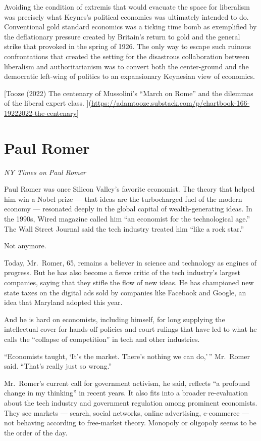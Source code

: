 \documentclass[
]{book}
\begin{document}
Avoiding the condition of extremis that would evacuate the space for liberalism was precisely what Keynes's political economics was ultimately intended to do. Conventional gold standard economics was a ticking time bomb as exemplified by the deflationary pressure created by Britain's return to gold and the general strike that provoked in the spring of 1926. The only way to escape such ruinous confrontations that created the setting for the disastrous collaboration between liberalism and authoritarianism was to convert both the center-ground and the democratic left-wing of politics to an expansionary Keynesian view of economics.

{[}Tooze (2022) The centenary of Mussolini's ``March on Rome'' and the dilemmas of the liberal expert class. {]}(\url{https://adamtooze.substack.com/p/chartbook-166-19222022-the-centenary}{]}

\hypertarget{paul-romer}{%
\section{Paul Romer}\label{paul-romer}}

\emph{NY Times on Paul Romer}

Paul Romer was once Silicon Valley's favorite economist. The theory that helped him win a Nobel prize --- that ideas are the turbocharged fuel of the modern economy --- resonated deeply in the global capital of wealth-generating ideas. In the 1990s, Wired magazine called him ``an economist for the technological age.'' The Wall Street Journal said the tech industry treated him ``like a rock star.''

Not anymore.

Today, Mr.~Romer, 65, remains a believer in science and technology as engines of progress. But he has also become a fierce critic of the tech industry's largest companies, saying that they stifle the flow of new ideas. He has championed new state taxes on the digital ads sold by companies like Facebook and Google, an idea that Maryland adopted this year.

And he is hard on economists, including himself, for long supplying the intellectual cover for hands-off policies and court rulings that have led to what he calls the ``collapse of competition'' in tech and other industries.

``Economists taught, `It's the market. There's nothing we can do,'\,'' Mr.~Romer said. ``That's really just so wrong.''

Mr.~Romer's current call for government activism, he said, reflects ``a profound change in my thinking'' in recent years.
It also fits into a broader re-evaluation about the tech industry and government regulation among prominent economists.
They see markets --- search, social networks, online advertising, e-commerce --- not behaving according to free-market theory. Monopoly or oligopoly seems to be the order of the day.
\end{document}

